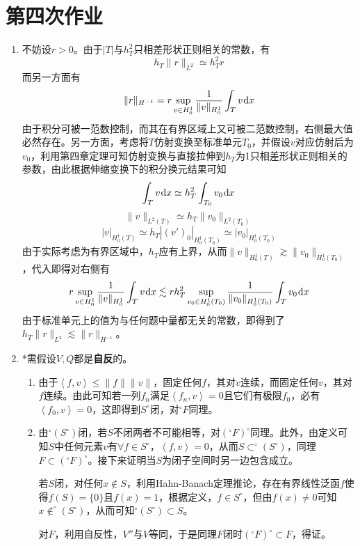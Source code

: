 \documentclass[a4paper,UTF8,fontset=windows,10pt]{ctexart}
\newcommand*{\dr}{\hspace{0.07em}\mathrm{d}}
\begin{document}
\section{第四次作业}
\begin{enumerate}
    \item 
    不妨设$r>0$。由于$|T|$与$h_T^2$只相差形状正则相关的常数，有
    $$h_T\|r\|_{L^2}\simeq h_T^2r$$
    而另一方面有
    $$\|r\|_{H^{-1}}=r\sup_{v\in H_0^1}\frac{1}{\|v\|_{H_0^1}}\int_Tv\dr x$$
    由于积分可被一范数控制，而其在有界区域上又可被二范数控制，右侧最大值必然存在。另一方面，考虑将$T$仿射变换至标准单元$T_0$，并假设$v$对应仿射后为$v_0$，利用第四章定理可知仿射变换与直接拉伸到$h_T$为1只相差形状正则相关的参数，由此根据伸缩变换下的积分换元结果可知
    $$\int_Tv\dr x\simeq h_T^2\int_{T_0}v_0\dr x$$
    $$\|v\|_{L^2(T)}\simeq h_T\|v_0\|_{L^2(T_0)}$$
    $$|v|_{H_0^1(T)}\simeq h_T|(v')_0|_{H_0^1(T_0)}\simeq|v_0|_{H_0^1(T_0)}$$
    由于实际考虑为有界区域中，$h_T$应有上界，从而$\|v\|_{H_0^1(T)}\gtrsim\|v_0\|_{H_0^1(T_0)}$，代入即得对右侧有
    $$r\sup_{v\in H_0^1}\frac{1}{\|v\|_{H_0^1}}\int_Tv\dr x\lesssim rh_T^2\sup_{v_0\in H_0^1(T_0)}\frac{1}{\|v_0\|_{H_0^1(T_0)}}\int_Tv_0\dr x$$
    由于标准单元上的值为与任何题中量都无关的常数，即得到了$h_T\|r\|_{L^2}\lesssim\|r\|_{H^{-1}}$。

    \item
    *需假设$V,Q$都是\textbf{自反}的。
    
    \begin{enumerate}
        \item 由于$\left<f,v\right>\le\|f\|\|v\|$，固定任何$f$，其对$v$连续，而固定任何$v$，其对$f$连续。由此可知若一列$f_n$满足$\left<f_n,v\right>=0$且它们有极限$f_0$，必有$\left<f_0,v\right>=0$，这即得到$S^\circ$闭，对$^\circ F$同理。
        
        \item 由$^\circ(S^\circ)$闭，若$S$不闭两者不可能相等，对$(^\circ F)^\circ$同理。此外，由定义可知$S$中任何元素$v$有$\forall f\in S^\circ$，$\left<f,v\right>=0$，从而$S\subset^\circ(S^\circ)$，同理$F\subset(^\circ F)^\circ$。接下来证明当$S$为闭子空间时另一边包含成立。
        
        若$S$闭，对任何$x\notin S$，利用Hahn-Banach定理推论，存在有界线性泛函$f$使得$f(S)=\{0\}$且$f(x)=1$，根据定义，$f\in S^\circ$，但由$f(x)\ne0$可知$x\notin^\circ(S^\circ)$，从而可知$^\circ(S^\circ)\subset S$。

        对$F$，利用自反性，$V''$与$V$等同，于是同理$F$闭时$(^\circ F)^\circ\subset F$，得证。


\end{enumerate}
\end{enumerate}
\end{document}
